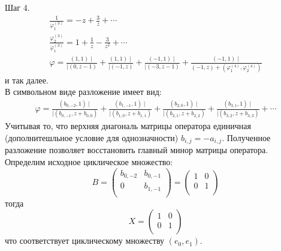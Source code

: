 Шаг 4.\\
\begin{eqnarray}
\frac {1}{\varphi_1^{(3)}}=-z+\frac{3}{z}+\cdots\nonumber\\
\frac {\varphi_2^{(3)}}{\varphi_1^{(3)}}=1+\frac{1}{z}-\frac{3}{z^2}+\cdots\nonumber\\
\varphi = \frac{(1,1)\mid} {\mid(0,z-1)}+ \frac{(1,1)\mid}
{\mid(-1,z)}+ \frac{(-1,1)\mid} {\mid(-3,z-1)}+ \frac{(-1,1)\mid}
{(-1,z)+(\varphi_{1}^{(4)},\varphi_{2}^{(4)})} \nonumber
\end{eqnarray}
и так далее.\\
В символьном виде разложение имеет вид:
\begin{eqnarray}
\varphi= \frac{(b_{0,-2},1)\mid} {\mid(b_{0,-1},z+b_{0,0})}+
\frac{(b_{1,-1},1)\mid} {\mid(b_{1,0},z+b_{1,1})}+
\frac{(b_{2,0},1)\mid} {\mid(b_{2,1},z+b_{2,2})}+
\frac{(b_{3,1},1)\mid} {\mid(b_{3,2},z+b_{3,3})}+\cdots\nonumber
\end{eqnarray}
Учитывая то, что верхняя диагональ матрицы оператора единичная
(дополнитешльное условие для однозначности) $b_{i,j}=-a_{i,j}$.
Полученное разложение позволяет восстановить главный минор
матрицы оператора. Определим исходное циклическое множество:
$$%
B=\left(
\begin{array}{cc}
b_{0,-2} & b_{0,-1}\\
0        & b_{1,-1}\\
\end{array}
\right) =\left(
\begin{array}{cc}
1 & 0\\
0 & 1\\
\end{array}
\right)
$$%
тогда
$$%
X=\left(
\begin{array}{cc}
1 & 0\\
0 & 1\\
\end{array}
\right)
$$%
что соответствует циклическому множеству
$(e_0,e_1)$.
